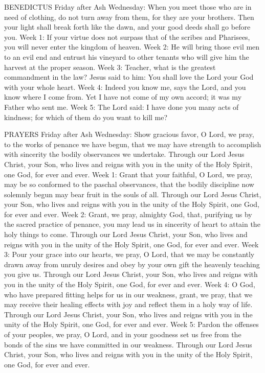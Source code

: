 BENEDICTUS
Friday after Ash Wednesday:	When you meet those who are in need of clothing, do not turn away from them, for they are your brothers. Then your light shall break forth like the dawn, and your good deeds shall go before you.
Week 1:	If your virtue does not surpass that of the scribes and Pharisees, you will never enter the kingdom of heaven.
Week 2:	He will bring those evil men to an evil end and entrust his vineyard to other tenants who will give him the harvest at the proper season.
Week 3:	Teacher, what is the greatest commandment in the law? Jesus said to him: You shall love the Lord your God with your whole heart.
Week 4:	Indeed you know me, says the Lord, and you know where I come from. Yet I have not come of my own accord; it was my Father who sent me.
Week 5:	The Lord said: I have done you many acts of kindness; for which of them do you want to kill me?

PRAYERS
Friday after Ash Wednesday:	Show gracious favor, O Lord, we pray, to the works of penance we have begun, that we may have strength to accomplish with sincerity the bodily observances we undertake. Through our Lord Jesus Christ, your Son, who lives and reigns with you in the unity of the Holy Spirit, one God, for ever and ever.
Week 1:	Grant that your faithful, O Lord, we pray, may be so conformed to the paschal observances, that the bodily discipline now solemnly begun may bear fruit in the souls of all. Through our Lord Jesus Christ, your Son, who lives and reigns with you in the unity of the Holy Spirit, one God, for ever and ever.
Week 2:	Grant, we pray, almighty God, that, purifying us by the sacred practice of penance, you may lead us in sincerity of heart to attain the holy things to come. Through our Lord Jesus Christ, your Son, who lives and reigns with you in the unity of the Holy Spirit, one God, for ever and ever.
Week 3:	Pour your grace into our hearts, we pray, O Lord, that we may be constantly drawn away from unruly desires and obey by your own gift the heavenly teaching you give us. Through our Lord Jesus Christ, your Son, who lives and reigns with you in the unity of the Holy Spirit, one God, for ever and ever.
Week 4:	O God, who have prepared fitting helps for us in our weakness, grant, we pray, that we may receive their healing effects with joy and reflect them in a holy way of life. Through our Lord Jesus Christ, your Son, who lives and reigns with you in the unity of the Holy Spirit, one God, for ever and ever.
Week 5:	Pardon the offenses of your peoples, we pray, O Lord, and in your goodness set us free from the bonds of the sins we have committed in our weakness. Through our Lord Jesus Christ, your Son, who lives and reigns with you in the unity of the Holy Spirit, one God, for ever and ever.

